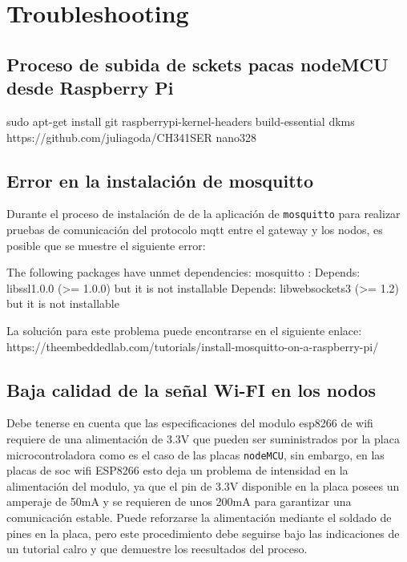 
\cleardoublepage

\chapter{Troubleshooting}
\label{AppendiB:Key1}

\section{Proceso de subida de sckets pacas nodeMCU desde Raspberry Pi}
\label{AppendiB:Key2}

sudo apt-get install git raspberrypi-kernel-headers build-essential dkms
https://github.com/juliagoda/CH341SER
nano328


\section{Error en la instalación de mosquitto}
\label{AppendiB:Key3}
Durante el proceso de instalación de de la aplicación de \verb|mosquitto| para realizar pruebas de comunicación del protocolo \gls{mqtt} entre el \gls{gateway} y los nodos, es posible que se muestre el siguiente error:

The following packages have unmet dependencies:
 mosquitto : Depends: libssl1.0.0 (>= 1.0.0) but it is not installable
             Depends: libwebsockets3 (>= 1.2) but it is not installable

La solución para este problema puede encontrarse en el siguiente enlace:
https://theembeddedlab.com/tutorials/install-mosquitto-on-a-raspberry-pi/

\section{Baja calidad de la señal Wi-FI en los nodos}
\label{AppendiB:key4}
Debe tenerse en cuenta que las especificaciones del modulo esp8266 de wifi requiere de una alimentación de 3.3V que pueden ser suministrados por la placa microcontroladora como es el caso de las placas \verb|nodeMCU|, sin embargo, en las placas de \gls{soc} \gls{wifi} ESP8266 esto deja un problema de intensidad en la alimentación del modulo, ya que el pin de 3.3V disponible en la placa posees un amperaje de 50mA y se requieren de unos 200mA para garantizar una comunicación estable. Puede reforzarse la alimentación mediante el soldado de pines en la placa, pero este procedimiento debe seguirse bajo las indicaciones de un tutorial calro y que demuestre los reesultados del proceso.

